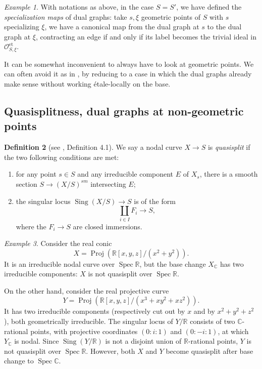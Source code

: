 \documentclass[a4paper,12pt]{amsart} %
\numberwithin{equation}{subsection}
\newcommand{\on}[1]{\operatorname{#1}}
\def\Sing{\operatorname{Sing}}
\newcommand{\Spec}{\operatorname{Spec}}
\theoremstyle{definition}
\newtheorem{definition}{Definition}[section]
\theoremstyle{plain}%
\theoremstyle{remark}
\newtheorem{example}[definition]{Example}
\renewcommand{\O}{\mathcal{O}}
\begin{document}
\begin{example}\label{exemple specialization maps}
With notations as above, in the case $S=S'$, we have defined the \emph{specialization maps} of dual graphs: take $s,\xi$ geometric points of $S$ with $s$ specializing $\xi$, we have a canonical map from the dual graph at $s$ to the dual graph at $\xi$, contracting an edge if and only if its label becomes the trivial ideal in $\O_{S,\xi}^{\on{et}}$.
\end{example}

It can be somewhat inconvenient to always have to look at geometric points. We can often avoid it as in \cite{HolmesUniversalJacobian}, by reducing to a case in which the dual graphs already make sense without working \'etale-locally on the base.

\subsection{Quasisplitness, dual graphs at non-geometric points}

\begin{definition}[see \cite{HolmesUniversalJacobian}, Definition 4.1]
	We say a nodal curve $X \to S$ is \emph{quasisplit} if the two following conditions are met:
\begin{enumerate}
\item for any point $s\in S$ and any irreducible component $E$ of $X_s$, there is a smooth section $S \to (X/S)^{sm}$ intersecting $E$;
\item the singular locus $\Sing(X/S)\to S$ is of the form
	\[
	\coprod\limits_{i\in I}F_i\to S,
	\]
where the $F_i\to S$ are closed immersions.
\end{enumerate}	
\end{definition}

\begin{example}
Consider the real conic
\[
X=\operatorname{Proj}(\mathbb R[x,y,z]/(x^2+y^2)).
\]
It is an irreducible nodal curve over $\Spec \mathbb R$, but the base change $X_{\mathbb C}$ has two irreducible components: $X$ is not quasisplit over $\Spec \mathbb R$.

On the other hand, consider the real projective curve
\[
Y=\operatorname{Proj}(\mathbb R[x,y,z]/(x^3+xy^2+xz^2)).
\]
It has two irreducible components (respectively cut out by $x$ and by $x^2+y^2+z^2$), both geometrically irreducible. The singular locus of $Y/\mathbb R$ consists of two $\mathbb{C}$-rational points, with projective coordinates $(0:i:1)$ and $(0:-i:1)$, at which $Y_{\mathbb C}$ is nodal. Since $\Sing(Y/\mathbb R)$ is not a disjoint union of $\mathbb R$-rational points, $Y$ is not quasisplit over $\Spec \mathbb R$. However, both $X$ and $Y$ become quasisplit after base change to $\Spec\mathbb{C}$.
\end{example}
\end{document}
